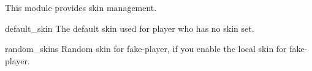 This module provides skin management.


\begin{Configuration}
    \item[default\_skin]{
        The default skin used for player who has no skin set.
    }

    \item[random\_skins]{
        Random skin for fake-player, if you enable the local skin for fake-player.
    }
\end{Configuration}
